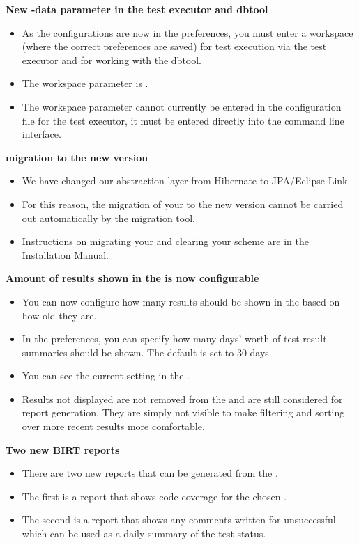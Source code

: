 \textbf{New -data parameter in the test executor and dbtool}
\begin{itemize}
\item As the \gddb{} configurations are now in the preferences, you must enter a workspace (where the correct preferences are saved) for test execution via the test executor and for working with the dbtool.
\item The workspace parameter is . 
\item The workspace parameter cannot currently be entered in the configuration file for the test executor, it must be entered directly into the command line interface.
\end{itemize}


\textbf{\gdproject{} migration to the new version}
\begin{itemize}
\item We have changed our \gddb{} abstraction layer from Hibernate to JPA/Eclipse Link.
\item For this reason, the migration of your \gdprojects{} to the new version cannot be carried out automatically by the \gddb{} migration tool. 
\item Instructions on migrating your \gdprojects{} and clearing your \gddb{} scheme are in the Installation Manual.
\end{itemize}

\textbf{Amount of results shown in the \gdtestsummaryview{} is now configurable}
\begin{itemize}
\item  You can now configure how many results should be shown in the \gdtestsummaryview{} based on how old they are.
\item In the  preferences, you can specify how many days' worth of test result summaries should be shown. The default is set to 30 days.
\item You can see the current setting in the \gdtestsummaryview{}.
\item Results not displayed are not removed from the \gddb{} and are still considered for report generation. They are simply not visible to make filtering and sorting over more recent results more comfortable.
\end{itemize}

\textbf{Two new BIRT reports}
\begin{itemize}
\item There are two new reports that can be generated from the \gdtestsummaryview{}. 
\item The first is a report that shows code coverage for the chosen \gdsuites{}.
\item The second is a report that shows any comments written for unsuccessful \gdsuites{} which can be used as a daily summary of the test status.
\end{itemize}

